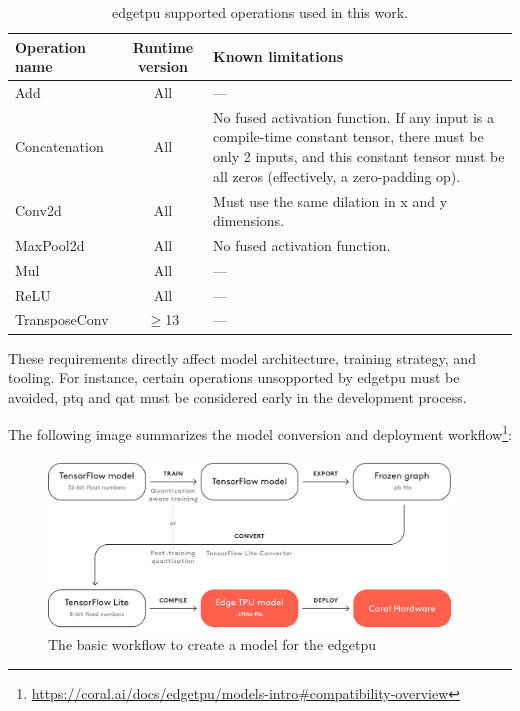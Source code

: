 {\begin{table}[h]
\centering
\begin{tabularx}{\linewidth}{@{}l c X@{}}
\toprule
Operation name & Runtime version & Known limitations \\
\midrule
Add            & All  & — \\
Concatenation  & All  & No fused activation function. If any input is a compile-time constant tensor, there must be only 2 inputs, and this constant tensor must be all zeros (effectively, a zero-padding op). \\
Conv2d         & All  & Must use the same dilation in x and y dimensions. \\
MaxPool2d      & All  & No fused activation function. \\
Mul            & All  & — \\
ReLU           & All  & — \\
TransposeConv  & $\geq$13 & — \\
\bottomrule
\end{tabularx}
\caption{\gls{edgetpu} supported operations used in this work.}
\label{tab:tpuops}
\end{table}


These requirements directly affect model architecture, training strategy, and tooling. For instance, certain operations unsopported by \gls{edgetpu} must be avoided,
\gls{ptq} and \gls{qat} must be considered early in the development process.

The following image summarizes the model conversion and deployment workflow\footnote{\url{https://coral.ai/docs/edgetpu/models-intro\#compatibility-overview}}:

\begin{figure}[H]
  \centering
  \includegraphics[width=0.95\textwidth]{files/Edge_TPU_quantization.png}
  \caption{The basic workflow to create a model for the \protect\gls{edgetpu}}
  \label{fig:quantization-chart}
\end{figure}

}
